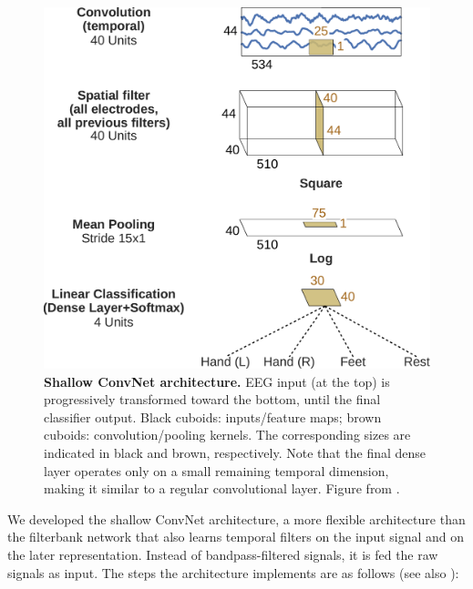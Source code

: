 \begin{figure}[ht]
    \myfloatalign
    \includegraphics[width=0.65\linewidth]{images/3D_Diagram_MatplotLib.ipynb.0.png}
    \caption[Shallow ConvNet architecture]{
    \textbf{Shallow ConvNet architecture.} EEG input (at the top) is
progressively transformed toward the bottom, until the final classifier
output. Black cuboids: inputs/feature maps; brown cuboids:
convolution/pooling kernels. The corresponding sizes are indicated in
black and brown, respectively. Note that the final dense layer operates
only on a small remaining temporal dimension, making it similar to a
regular convolutional layer. Figure from
\citet{schirrmeisterdeephbm2017}.}\label{shallow-net-figure}
\end{figure}



    We developed the shallow ConvNet architecture, a more flexible
architecture than the filterbank network that also learns temporal
filters on the input signal and on the later representation. Instead of
bandpass-filtered signals, it is fed the raw signals as input. The steps
the architecture implements are as follows (see also ):

